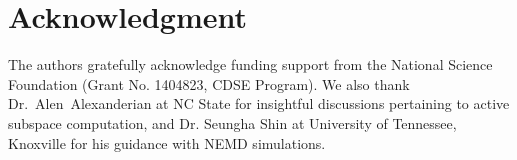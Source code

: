 \section*{Acknowledgment}

The authors gratefully acknowledge funding support from the
National Science Foundation (Grant No. 1404823, CDSE Program).
We also thank Dr.~Alen~Alexanderian at NC State for
insightful discussions pertaining to active subspace computation, and
Dr. Seungha Shin at University of
Tennessee, Knoxville for his guidance with NEMD simulations.
